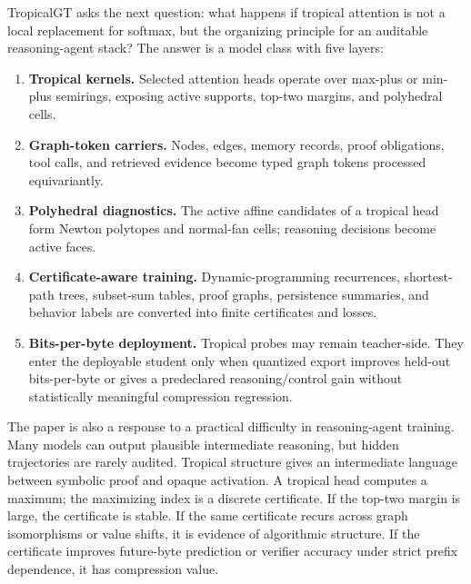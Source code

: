 \documentclass[11pt]{article}
\begin{document}
TropicalGT asks the next question: what happens if tropical attention is not a local replacement for softmax, but the organizing principle for an auditable reasoning-agent stack?  The answer is a model class with five layers:
\begin{enumerate}
\item \textbf{Tropical kernels.}  Selected attention heads operate over max-plus or min-plus semirings, exposing active supports, top-two margins, and polyhedral cells.
\item \textbf{Graph-token carriers.}  Nodes, edges, memory records, proof obligations, tool calls, and retrieved evidence become typed graph tokens processed equivariantly.
\item \textbf{Polyhedral diagnostics.}  The active affine candidates of a tropical head form Newton polytopes and normal-fan cells; reasoning decisions become active faces.
\item \textbf{Certificate-aware training.}  Dynamic-programming recurrences, shortest-path trees, subset-sum tables, proof graphs, persistence summaries, and behavior labels are converted into finite certificates and losses.
\item \textbf{Bits-per-byte deployment.}  Tropical probes may remain teacher-side.  They enter the deployable student only when quantized export improves held-out bits-per-byte or gives a predeclared reasoning/control gain without statistically meaningful compression regression.
\end{enumerate}

The paper is also a response to a practical difficulty in reasoning-agent training.  Many models can output plausible intermediate reasoning, but hidden trajectories are rarely audited.  Tropical structure gives an intermediate language between symbolic proof and opaque activation.  A tropical head computes a maximum; the maximizing index is a discrete certificate.  If the top-two margin is large, the certificate is stable.  If the same certificate recurs across graph isomorphisms or value shifts, it is evidence of algorithmic structure.  If the certificate improves future-byte prediction or verifier accuracy under strict prefix dependence, it has compression value.
\end{document}
